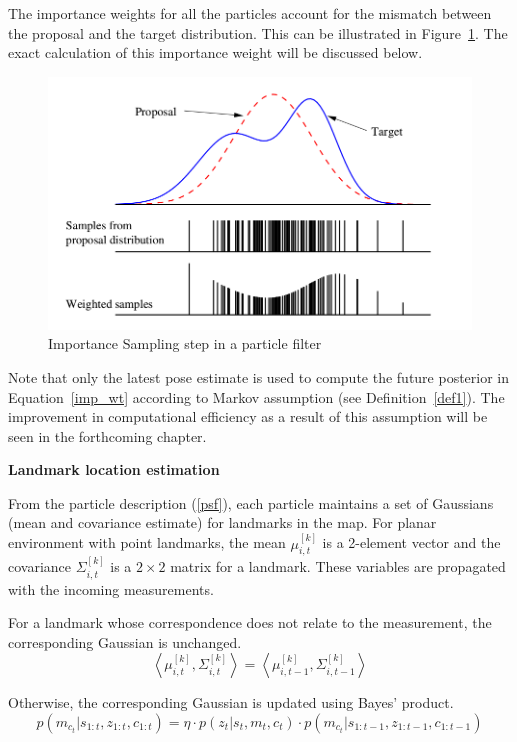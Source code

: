 The importance weights for all the particles account for the mismatch between the proposal and the target distribution. This can be illustrated in Figure~\ref{sample_weighting}. The exact calculation of this importance weight will be discussed below. 
\begin{figure}
\centering
\includegraphics[scale=0.4]{./images/sample_weighting}
\caption[Importance Sampling in a particle filter]{Importance Sampling step in a particle filter \cite{thrun2005probabilistic}}
\label{sample_weighting}
\end{figure}

Note that only the latest pose estimate is used to compute the future posterior in Equation~\ref{imp_wt} according to Markov assumption (see Definition~\ref{def1}). The improvement in computational efficiency as a result of this assumption will be seen in the forthcoming chapter.

\textbf{Landmark location estimation}

From the particle description (\ref{psf}), each particle maintains a set of Gaussians (mean and covariance estimate) for landmarks in the map. For planar environment with point landmarks, the mean $\mu_{i,t}^{[k]}$ is a 2-element vector and the covariance $\Sigma_{i,t}^{[k]}$ is a $2\times 2$ matrix for a landmark. These variables are propagated with the incoming measurements.

For a landmark whose correspondence does not relate to the measurement, the corresponding Gaussian is unchanged.
\begin{equation}
\left\langle \mu_{i,t}^{[k]}, \Sigma_{i,t}^{[k]} \right\rangle=\left\langle \mu_{i,t-1}^{[k]}, \Sigma_{i,t-1}^{[k]} \right\rangle
\end{equation}

Otherwise, the corresponding Gaussian is updated using Bayes' product.
\begin{equation}
p(m_{c_t}|s_{1:t},z_{1:t},c_{1:t})=\eta\cdot p(z_t|s_t,m_t,c_t)\cdot p(m_{c_t}|s_{1:t-1},z_{1:t-1},c_{1:t-1})
\label{bayes_produp}
\end{equation}    

